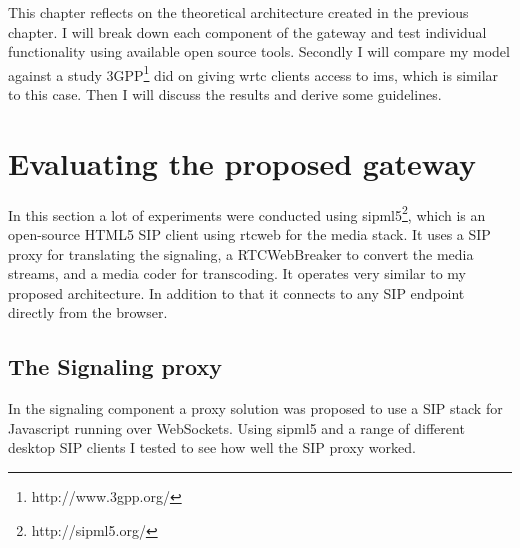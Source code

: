 
This chapter reflects on the theoretical architecture created in the previous chapter. I will break down each component of the gateway and test individual functionality using available open source tools. Secondly I will compare my model against a study 3GPP\footnote{http://www.3gpp.org/} did on giving \gls{wrtc} clients access to \gls{ims}, which is similar to this case. Then I will discuss the results and derive some guidelines.

\section{Evaluating the proposed gateway}
In this section a lot of experiments were conducted using sipml5\footnote{http://sipml5.org/}, which is an open-source HTML5 SIP client using \gls{rtcweb} for the media stack. It uses a SIP proxy for translating the signaling, a RTCWebBreaker to convert the media streams, and a media coder for transcoding. It operates very similar to my proposed architecture. In addition to that it connects to any SIP endpoint directly from the browser.

\subsection{The Signaling proxy}
In the signaling component a proxy solution was proposed to use a SIP stack for Javascript running over WebSockets. Using sipml5 and a range of different desktop SIP clients I tested to see how well the SIP proxy worked.   


